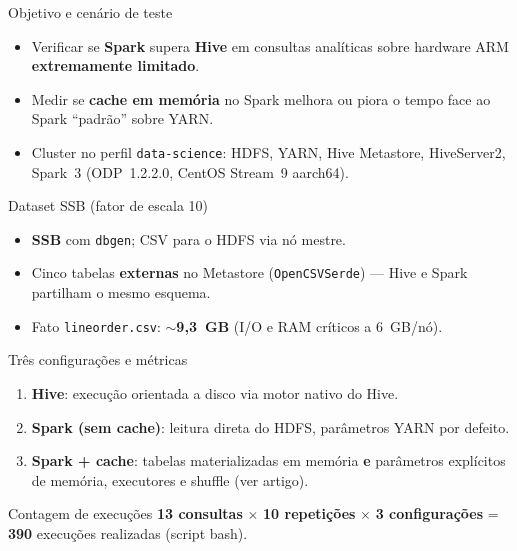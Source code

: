 
\begin{frame}{Objetivo e cen\'ario de teste}
  \begin{itemize}
    \item Verificar se \textbf{Spark} supera \textbf{Hive} em consultas anal\'iticas sobre hardware ARM \textbf{extremamente limitado}.
    \item Medir se \textbf{cache em mem\'oria} no Spark melhora ou piora o tempo face ao Spark ``padr\~ao'' sobre YARN.
    \item Cluster no perfil \texttt{data-science}: HDFS, YARN, Hive Metastore, HiveServer2, Spark~3 (ODP~1.2.2.0, CentOS Stream~9 aarch64).
  \end{itemize}
\end{frame}

\begin{frame}{Dataset SSB (fator de escala 10)}
  \begin{itemize}
    \item \textbf{SSB} com \texttt{dbgen}; CSV para o HDFS via n\'o mestre.
    \item Cinco tabelas \textbf{externas} no Metastore (\texttt{OpenCSVSerde}) --- Hive e Spark partilham o mesmo esquema.
    \item Fato \texttt{lineorder.csv}: \textbf{$\sim$9{,}3~GB} (I/O e RAM cr\'iticos a 6~GB/n\'o).
  \end{itemize}
\end{frame}

\begin{frame}{Tr\^es configura\c{c}\~oes e m\'etricas}
  \begin{enumerate}
    \item \textbf{Hive}: execu\c{c}\~ao orientada a disco via motor nativo do Hive.
    \item \textbf{Spark (sem cache)}: leitura direta do HDFS, par\^ametros YARN por defeito.
    \item \textbf{Spark + cache}: tabelas materializadas em mem\'oria \textbf{e} par\^ametros expl\'icitos de mem\'oria, executores e shuffle (ver artigo).
  \end{enumerate}
  \vspace{0.35em}
  \begin{cefetalertblock}{Contagem de execu\c{c}\~oes}
    \textbf{13 consultas} $\times$ \textbf{10 repeti\c{c}\~oes} $\times$ \textbf{3 configura\c{c}\~oes} = \textbf{390} execuções realizadas (script bash).
  \end{cefetalertblock}
\end{frame}

